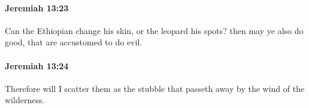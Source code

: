 		\paragraph{Jeremiah 13:23} %
			\label{JEREMIAH-13-23}

			Can the Ethiopian change his skin, or the leopard his spots? then may ye also do good, that are accustomed to do evil.


		\paragraph{Jeremiah 13:24} %
			\label{JEREMIAH-13-24}

			Therefore will I scatter them as the stubble that passeth away by the wind of the wilderness.


